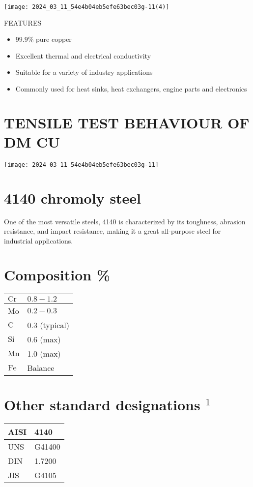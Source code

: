 \documentclass[10pt]{article}
\begin{document}
\begin{center}
\texttt{[image: 2024\_03\_11\_54e4b04eb5efe63bec03g-11(4)]}
\end{center}

FEATURES

\begin{itemize}
  \item $99.9 \%$ pure copper
  \item Excellent thermal and electrical conductivity
  \item Suitable for a variety of industry applications
  \item Commonly used for heat sinks, heat exchangers, engine parts and electronics
\end{itemize}

\section*{TENSILE TEST BEHAVIOUR OF DM CU}
\begin{center}
\texttt{[image: 2024\_03\_11\_54e4b04eb5efe63bec03g-11]}
\end{center}

\section*{4140 chromoly steel}
One of the most versatile steels, 4140 is characterized by its toughness, abrasion resistance, and impact resistance, making it a great all-purpose steel for industrial applications.

\section*{Composition \%}
\begin{center}
\begin{tabular}{ll}
$\mathrm{Cr}$ & $0.8-1.2$ \\
\hline
Mo & $0.2-0.3$ \\
\hline
$\mathrm{C}$ & 0.3 (typical) \\
\hline
$\mathrm{Si}$ & 0.6 (max) \\
\hline
$\mathrm{Mn}$ & 1.0 (max) \\
\hline
$\mathrm{Fe}$ & Balance \\
\hline
\end{tabular}
\end{center}

\section*{Other standard designations ${ }^{1}$}
\begin{center}
\begin{tabular}{ll}
AISI & 4140 \\
\hline
UNS & G41400 \\
\hline
DIN & 1.7200 \\
\hline
JIS & G4105 \\
\hline
\end{tabular}
\end{center}
\end{document}
